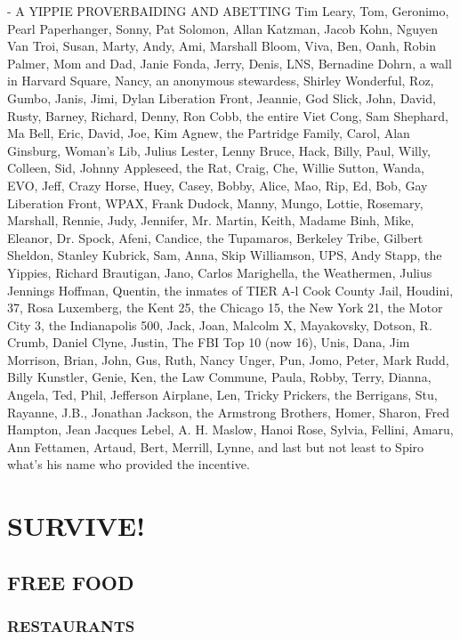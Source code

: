 \documentclass[11pt,twoside,a4paper]{book}
\begin{document}
- A YIPPIE PROVERBAIDING AND ABETTING Tim Leary, Tom, Geronimo, Pearl Paperhanger, Sonny, Pat Solomon, Allan Katzman, Jacob Kohn, Nguyen Van Troi, Susan, Marty, Andy, Ami, Marshall Bloom, Viva, Ben, Oanh, Robin Palmer, Mom and Dad, Janie Fonda, Jerry, Denis, LNS, Bernadine Dohrn, a wall in Harvard Square, Nancy, an anonymous stewardess, Shirley Wonderful, Roz, Gumbo, Janis, Jimi, Dylan Liberation Front, Jeannie, God Slick, John, David, Rusty, Barney, Richard, Denny, Ron Cobb, the entire Viet Cong, Sam Shephard, Ma Bell, Eric, David, Joe, Kim Agnew, the Partridge Family, Carol, Alan Ginsburg, Woman's Lib, Julius Lester, Lenny Bruce, Hack, Billy, Paul, Willy, Colleen, Sid, Johnny Appleseed, the Rat, Craig, Che, Willie Sutton, Wanda, EVO, Jeff, Crazy Horse, Huey, Casey, Bobby, Alice, Mao, Rip, Ed, Bob, Gay Liberation Front, WPAX, Frank Dudock, Manny, Mungo, Lottie, Rosemary, Marshall, Rennie, Judy, Jennifer, Mr. Martin, Keith, Madame Binh, Mike, Eleanor, Dr. Spock, Afeni, Candice, the Tupamaros, Berkeley Tribe, Gilbert Sheldon, Stanley Kubrick, Sam, Anna, Skip Williamson, UPS, Andy Stapp, the Yippies, Richard Brautigan, Jano, Carlos Marighella, the Weathermen, Julius Jennings Hoffman, Quentin, the inmates of TIER A-l Cook County Jail, Houdini, 37, Rosa Luxemberg, the Kent 25, the Chicago 15, the New York 21, the Motor City 3, the Indianapolis 500, Jack, Joan, Malcolm X, Mayakovsky, Dotson, R. Crumb, Daniel Clyne, Justin, The FBI Top 10 (now 16), Unis, Dana, Jim Morrison, Brian, John, Gus, Ruth, Nancy Unger, Pun, Jomo, Peter, Mark Rudd, Billy Kunstler, Genie, Ken, the Law Commune, Paula, Robby, Terry, Dianna, Angela, Ted, Phil, Jefferson Airplane, Len, Tricky Prickers, the Berrigans, Stu, Rayanne, J.B., Jonathan Jackson, the Armstrong Brothers, Homer, Sharon, Fred Hampton, Jean Jacques Lebel, A. H. Maslow, Hanoi Rose, Sylvia, Fellini, Amaru, Ann Fettamen, Artaud, Bert, Merrill, Lynne, and last but not least to Spiro what's his name who provided the incentive.

\clearpage

\chapter{SURVIVE!} 

\section{FREE FOOD}

\subsection{RESTAURANTS}
\end{document}
